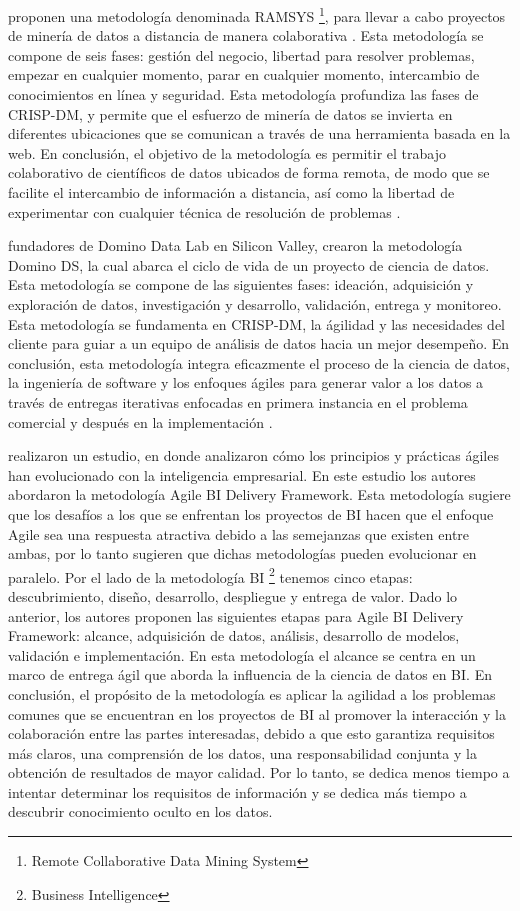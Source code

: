 \cite{Mladenic2012} proponen una metodología denominada RAMSYS \footnote{Remote Collaborative Data Mining System}, para llevar a cabo proyectos de minería de datos a distancia de manera colaborativa . Esta metodología se compone de seis fases: gestión del negocio,  libertad para resolver problemas, empezar en cualquier momento, parar en cualquier momento, intercambio de conocimientos en línea y seguridad. Esta metodología profundiza las fases de CRISP-DM, y permite que el esfuerzo de minería de datos se invierta en diferentes ubicaciones que se comunican a través de una herramienta basada en la web. En conclusión, el objetivo de la metodología es permitir el trabajo colaborativo de científicos de datos ubicados de forma remota, de modo que se facilite el intercambio de información a distancia, así como la libertad de experimentar con cualquier técnica de resolución de problemas \cite{Martinez2021}.

\cite{Elprin2022} fundadores de Domino Data Lab en Silicon Valley, crearon la metodología Domino DS, la cual abarca el ciclo de vida de un proyecto de ciencia de datos. Esta metodología se compone de las siguientes fases: ideación, adquisición y exploración de datos, investigación y desarrollo, validación, entrega y monitoreo. Esta metodología se fundamenta en CRISP-DM, la ágilidad y las necesidades del cliente para guiar a un equipo de análisis de datos hacia un mejor desempeño. En conclusión, esta metodología integra eficazmente el proceso de la ciencia de datos, la ingeniería de software y los enfoques ágiles para generar valor a los datos a través de entregas iterativas enfocadas en primera instancia en el problema comercial y después en la implementación  \cite{Martinez2021}.

\cite{Larson2016} realizaron un estudio, en donde analizaron cómo los principios y prácticas ágiles han evolucionado con la inteligencia empresarial. En este estudio los autores abordaron la metodología Agile BI Delivery Framework. Esta metodología sugiere que los desafíos a los que se enfrentan los proyectos de BI hacen que el enfoque Agile sea una respuesta atractiva debido a las semejanzas que existen entre ambas, por lo tanto sugieren que dichas metodologías pueden evolucionar en paralelo. Por el lado de la metodología BI \footnote{Business Intelligence} tenemos cinco etapas: descubrimiento, diseño, desarrollo, despliegue y entrega de valor. Dado lo anterior, los autores proponen las siguientes etapas para Agile BI Delivery Framework: alcance, adquisición de datos, análisis, desarrollo de modelos, validación e implementación. En esta metodología el alcance se centra en un marco de entrega ágil que aborda la influencia de la ciencia de datos en BI. En conclusión, el propósito de la metodología es aplicar la agilidad a los problemas comunes que se encuentran en los proyectos de BI al promover la interacción y la colaboración entre las partes interesadas, debido a que esto garantiza requisitos más claros, una comprensión de los datos, una responsabilidad conjunta y la obtención de resultados de mayor calidad. Por lo tanto, se dedica menos tiempo a intentar determinar los requisitos de información y se dedica más tiempo a descubrir conocimiento oculto en los datos.

